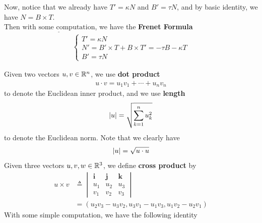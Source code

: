 \documentclass{report}
\begin{document}
\begin{mdframed}
Now, notice that we already have $T'=\kappa N$ and $B'=\tau N$, and by basic identity, we have $N=B\times T$.\\

Then $\underline{\text{with some computation}}$, we have the \textbf{Frenet Formula}
\begin{align*}
\begin{cases}
  T'=\kappa N\\
  N'=B'\times T+B\times T'=-\tau B-\kappa T\\
  B'=\tau N
\end{cases}
\end{align*}
\end{mdframed}
\begin{mdframed}
Given two vectors $u,v \in\mathbb{R}^n$, we use  \textbf{dot product} 
\begin{align*}
u\cdot v= u_1v_1+\cdots + u_nv_n
\end{align*}
to denote the Euclidean inner product, and we use \textbf{length} 
\begin{align*}
\left|u\right|=\sqrt{\sum_{k=1}^n u_k^2} 
\end{align*}
to denote the Euclidean norm. Note that we clearly have 
\begin{align*}
\left|u\right|=\sqrt{u\cdot u} 
\end{align*}
Given three vectors $u,v,w \in\mathbb{R}^3$, we define \textbf{cross product} by 
\begin{align*}
  u\times v&\triangleq \begin{vmatrix} 
  \textbf{i} & \textbf{j} & \textbf{k}\\
  u_1 & u_2 & u_3 \\
  v_1 & v_2 & v_3
\end{vmatrix}\\
&=(u_2v_3-u_3v_2,u_3v_1-u_1v_3,u_1v_2-u_2v_1)
\end{align*}
With some simple computation, we have the following identity 
\end{mdframed}
\end{document}
